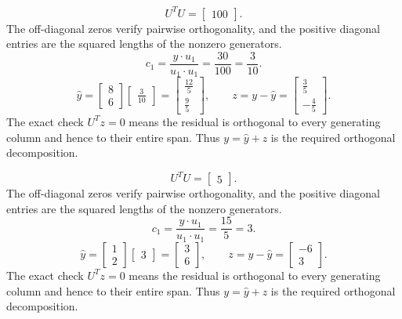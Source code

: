 \[U^TU=\left[\begin{array}{r}100\end{array}\right].\]
The off-diagonal zeros verify pairwise orthogonality, and the positive diagonal entries are the squared lengths of the nonzero generators.
\[c_{1}=\frac{y\cdot u_{1}}{u_{1}\cdot u_{1}}=\frac{30}{100}=\frac{3}{10}.\]
\[\widehat y=\left[\begin{array}{r}8\\6\end{array}\right]\left[\begin{array}{r}\frac{3}{10}\end{array}\right]=\left[\begin{array}{r}\frac{12}{5}\\\frac{9}{5}\end{array}\right],\qquad z=y-\widehat y=\left[\begin{array}{r}\frac{3}{5}\\- \frac{4}{5}\end{array}\right].\]
The exact check $U^Tz=0$ means the residual is orthogonal to every generating column and hence to their entire span. Thus $y=\widehat y+z$ is the required orthogonal decomposition.

\[U^TU=\left[\begin{array}{r}5\end{array}\right].\]
The off-diagonal zeros verify pairwise orthogonality, and the positive diagonal entries are the squared lengths of the nonzero generators.
\[c_{1}=\frac{y\cdot u_{1}}{u_{1}\cdot u_{1}}=\frac{15}{5}=3.\]
\[\widehat y=\left[\begin{array}{r}1\\2\end{array}\right]\left[\begin{array}{r}3\end{array}\right]=\left[\begin{array}{r}3\\6\end{array}\right],\qquad z=y-\widehat y=\left[\begin{array}{r}-6\\3\end{array}\right].\]
The exact check $U^Tz=0$ means the residual is orthogonal to every generating column and hence to their entire span. Thus $y=\widehat y+z$ is the required orthogonal decomposition.

